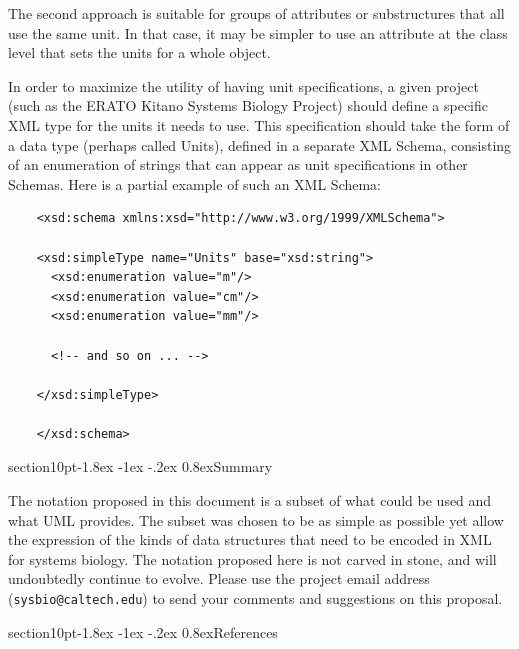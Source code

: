 \documentclass[10pt]{article}
\makeatletter
\renewcommand{\section}{\@startsection%
  {section}{1}{0pt}{-1.8ex \@plus -1ex \@minus -.2ex}%
  {0.8ex}{\normalfont\Large\bfseries}}
\newcommand{\tightspacing}{\renewcommand{\baselinestretch}{0.85}}
\newcommand{\regularspacing}{\renewcommand{\baselinestretch}{1.0}}
\newcommand{\class}[1]{\textsf{#1}}
\makeatother
\begin{document}
The second approach is suitable for groups of attributes or substructures
that all use the same unit.  In that case, it may be simpler to use an
attribute at the class level that sets the units for a whole object.

In order to maximize the utility of having unit specifications, a given
project (such as the ERATO Kitano Systems Biology Project) should define a
specific XML type for the units it needs to use.  This specification should
take the form of a data type (perhaps called \class{Units}), defined in a
separate XML Schema, consisting of an enumeration of strings that can
appear as unit specifications in other Schemas.  Here is a partial example
of such an XML Schema:
\begin{small}
  \tightspacing
\begin{verbatim}
    <xsd:schema xmlns:xsd="http://www.w3.org/1999/XMLSchema">
    
    <xsd:simpleType name="Units" base="xsd:string">
      <xsd:enumeration value="m"/>
      <xsd:enumeration value="cm"/>
      <xsd:enumeration value="mm"/>

      <!-- and so on ... -->

    </xsd:simpleType>

    </xsd:schema>
\end{verbatim}
  \regularspacing
\end{small}



\section{Summary}

The notation proposed in this document is a subset of what could be used
and what UML provides.  The subset was chosen to be as simple as possible
yet allow the expression of the kinds of data structures that need to be
encoded in XML for systems biology.  The notation proposed here is not
carved in stone, and will undoubtedly continue to evolve.  Please use the
project email address (\texttt{sysbio@caltech.edu}) to send your
comments and suggestions on this proposal.


\section{References}
\end{document}
